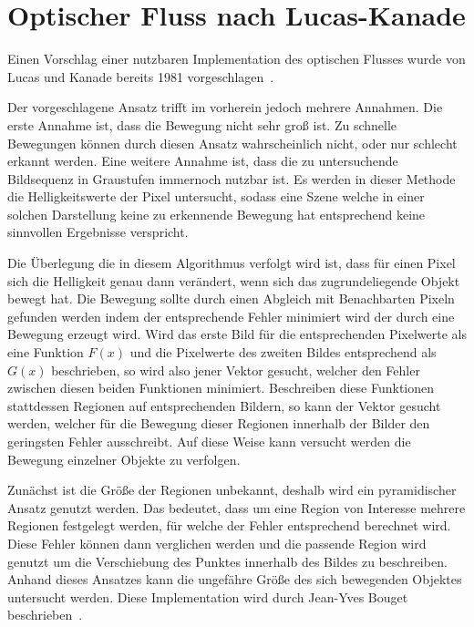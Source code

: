 
\section{Optischer Fluss nach Lucas-Kanade}\label{ch:lucas_kanade}

Einen Vorschlag einer nutzbaren Implementation des optischen Flusses wurde von Lucas und Kanade bereits 1981 vorgeschlagen~\cite{Lucas1981}.

Der vorgeschlagene Ansatz trifft im vorherein jedoch mehrere Annahmen.
Die erste Annahme ist, dass die Bewegung nicht sehr gro{\ss} ist.
Zu schnelle Bewegungen können durch diesen Ansatz wahrscheinlich nicht, oder nur schlecht erkannt werden.
Eine weitere Annahme ist, dass die zu untersuchende Bildsequenz in Graustufen immernoch nutzbar ist.
Es werden in dieser Methode die Helligkeitswerte der Pixel untersucht, sodass eine Szene welche in einer solchen Darstellung keine zu erkennende Bewegung hat entsprechend keine sinnvollen Ergebnisse verspricht.

Die Überlegung die in diesem Algorithmus verfolgt wird ist, dass für einen Pixel sich die Helligkeit genau dann verändert, wenn sich das zugrundeliegende Objekt bewegt hat.
Die Bewegung sollte durch einen Abgleich mit Benachbarten Pixeln gefunden werden indem der entsprechende Fehler minimiert wird der durch eine Bewegung erzeugt wird.
Wird das erste Bild für die entsprechenden Pixelwerte als eine Funktion $F(x)$ und die Pixelwerte des zweiten Bildes entsprechend als $G(x)$ beschrieben, so wird also jener Vektor gesucht, welcher den Fehler zwischen diesen beiden Funktionen minimiert.
Beschreiben diese Funktionen stattdessen Regionen auf entsprechenden Bildern, so kann der Vektor gesucht werden, welcher für die Bewegung dieser Regionen innerhalb der Bilder den geringsten Fehler ausschreibt.
Auf diese Weise kann versucht werden die Bewegung einzelner Objekte zu verfolgen.

Zunächst ist die Grö{\ss}e der Regionen unbekannt, deshalb wird ein pyramidischer Ansatz genutzt werden.
Das bedeutet, dass um eine Region von Interesse mehrere Regionen festgelegt werden, für welche der Fehler entsprechend berechnet wird.
Diese Fehler können dann verglichen werden und die passende Region wird genutzt um die Verschiebung des Punktes innerhalb des Bildes zu beschreiben.
Anhand dieses Ansatzes kann die ungefähre Grö{\ss}e des sich bewegenden Objektes untersucht werden.
Diese Implementation wird durch Jean-Yves Bouget beschrieben~\cite{Bouguet2000}.


